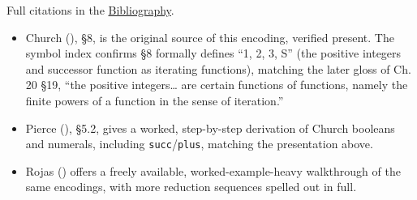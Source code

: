 Full citations in the \hyperref[sec:root:bibliography:1]{Bibliography}.

\begin{itemize}
\tightlist
\item
  Church (\cite{Church1941}), §8, is the original source of this encoding, verified present. The symbol index confirms §8 formally defines ``1, 2, 3, S'' (the positive integers and successor function as iterating functions), matching the later gloss of Ch. 20 §19, ``the positive integers\ldots{} are certain functions of functions, namely the finite powers of a function in the sense of iteration.''
\item
  Pierce (\cite{Pierce2002}), §5.2, gives a worked, step-by-step derivation of Church booleans and numerals, including \texttt{succ}/\texttt{plus}, matching the presentation above.
\item
  Rojas (\cite{Rojas2015}) offers a freely available, worked-example-heavy walkthrough of the same encodings, with more reduction sequences spelled out in full.
\end{itemize}
